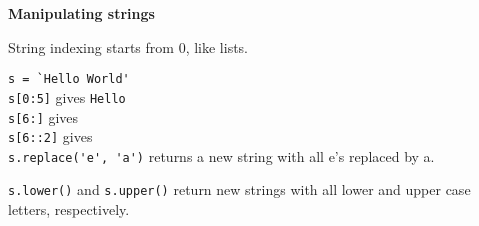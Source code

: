 \textbf{Manipulating strings}

String indexing starts from 0, like lists.

\lstinline|s = `Hello World'|\\
\lstinline|s[0:5]| gives \texttt{Hello}\\
\lstinline|s[6:]| gives \\
\lstinline|s[6::2]| gives \\

\lstinline|s.replace('e', 'a')| returns a new string with all e's
replaced by a.  

\lstinline|s.lower()| and \lstinline|s.upper()| return new strings
with all lower and upper case letters, respectively.
